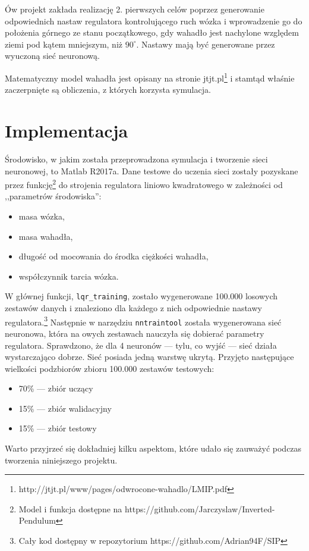 \documentclass[10pt,a4paper,titlepage]{article}
\begin{document}
	Ów projekt zakłada realizację 2. pierwszych celów poprzez generowanie odpowiednich nastaw regulatora kontrolującego ruch wózka i wprowadzenie go do położenia górnego ze stanu początkowego, gdy wahadło jest nachylone względem ziemi pod kątem mniejszym, niż $90^\circ$. Nastawy mają być generowane przez wyuczoną sieć neuronową.
	
	Matematyczny model wahadła jest opisany na stronie jtjt.pl\footnote{http://jtjt.pl/www/pages/odwrocone-wahadlo/LMIP.pdf} i stamtąd właśnie zaczerpnięte są obliczenia, z których korzysta symulacja.
	
	\section{Implementacja}
	Środowisko, w jakim została przeprowadzona symulacja i tworzenie sieci neuronowej, to Matlab R2017a. Dane testowe do uczenia sieci zostały pozyskane przez funkcję\footnote{Model i funkcja dostępne na https://github.com/Jarczyslaw/Inverted-Pendulum} do strojenia regulatora liniowo kwadratowego w zależności od ,,parametrów środowiska'':
	\begin{itemize}
		\item masa wózka,
		\item masa wahadła,
		\item długość od mocowania do środka ciężkości wahadła,
		\item współczynnik tarcia wózka.
	\end{itemize}
		
	W głównej funkcji, \texttt{lqr\_training}, zostało wygenerowane 100.000 losowych zestawów danych i znaleziono dla każdego z nich odpowiednie nastawy regulatora.\footnote{Cały kod dostępny w repozytorium https://github.com/Adrian94F/SIP} Następnie w narzędziu \texttt{nntraintool} została wygenerowana sieć neuronowa, która na owych zestawach nauczyła się dobierać parametry regulatora. Sprawdzono, że dla 4 neuronów --- tylu, co wyjść --- sieć działa wystarczająco dobrze. Sieć posiada jedną warstwę ukrytą. Przyjęto następujące wielkości podzbiorów zbioru 100.000 zestawów testowych:
	\begin{itemize}
		\item 70\% --- zbiór uczący
		\item 15\% --- zbiór walidacyjny
		\item 15\% --- zbiór testowy
	\end{itemize}
	
	Warto przyjrzeć się dokładniej kilku aspektom, które udało się zauważyć podczas tworzenia niniejszego projektu. 
	
\end{document}
